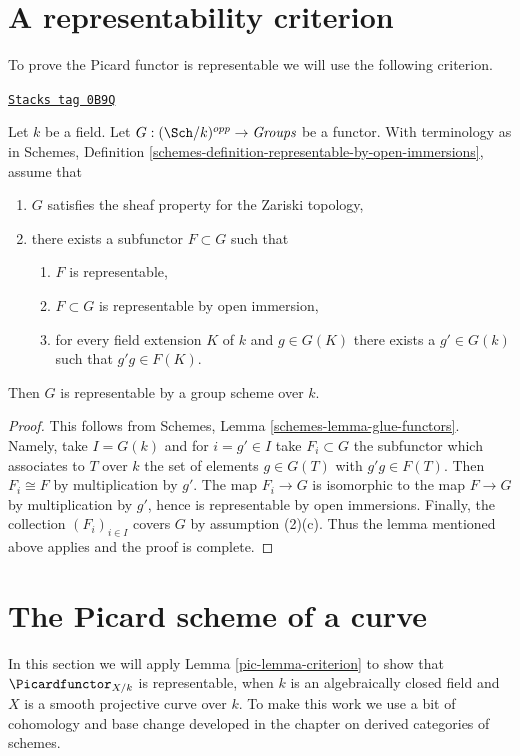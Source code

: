 \section{A representability criterion}
\label{pic-section-representability}
To prove the Picard functor is representable we will use the following
criterion.

\begin{lemma}[Criterion]
\label{pic-lemma-criterion}
\href{https://stacks.math.columbia.edu/tag/0B9Q}{\texttt{Stacks tag 0B9Q}}

Let $k$ be a field. Let $G : (\Sch/k)^{opp} \to \textit{Groups}$ be a
functor. With terminology as in
Schemes, Definition \ref{schemes-definition-representable-by-open-immersions},
assume that
\begin{enumerate}
\item $G$ satisfies the sheaf property for the Zariski topology,
\item there exists a subfunctor $F \subset G$ such that
\begin{enumerate}
\item $F$ is representable,
\item $F \subset G$ is representable by open immersion,
\item for every field extension $K$ of $k$ and $g \in G(K)$
there exists a $g' \in G(k)$ such that $g'g \in F(K)$.
\end{enumerate}
\end{enumerate}
Then $G$ is representable by a group scheme over $k$.
\end{lemma}

\begin{proof}
This follows from Schemes, Lemma \ref{schemes-lemma-glue-functors}.
Namely, take $I = G(k)$ and for $i = g' \in I$ take $F_i \subset G$
the subfunctor which associates to $T$ over $k$ the set of elements
$g \in G(T)$ with $g'g \in F(T)$. Then $F_i \cong F$ by multiplication
by $g'$. The map $F_i \to G$ is isomorphic to the map $F \to G$
by multiplication by $g'$, hence is representable by open immersions.
Finally, the collection $(F_i)_{i \in I}$ covers $G$ by assumption (2)(c).
Thus the lemma mentioned above applies and the proof is complete.
\end{proof}

\section{The Picard scheme of a curve}
\label{pic-section-picard-curve}
In this section we will apply Lemma \ref{pic-lemma-criterion} to show that
$\Picardfunctor_{X/k}$ is representable, when $k$ is an algebraically
closed field and $X$ is a smooth projective curve over $k$. To make this
work we use a bit of cohomology and base change developed in
the chapter on derived categories of schemes.

